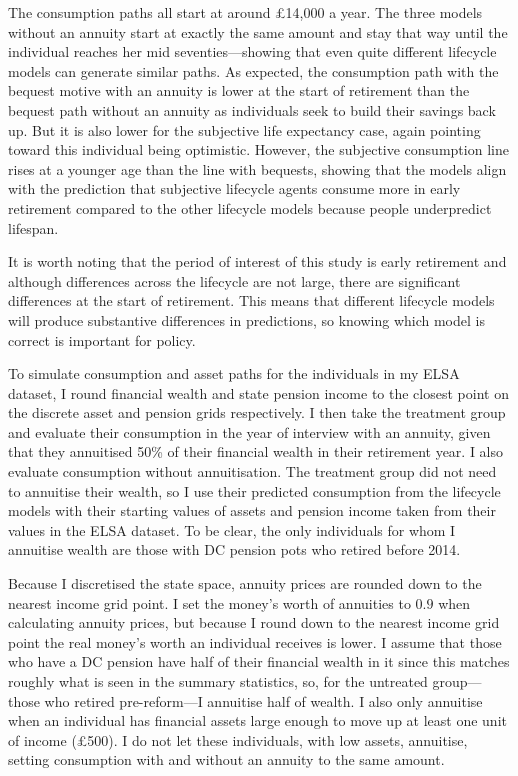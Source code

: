 \documentclass[12pt]{article}
\begin{document}
The consumption paths all start at around £14,000 a year. The three models without an
annuity start at exactly the same amount and stay that way until the individual
reaches her mid seventies---showing that even quite different lifecycle models
can generate similar paths. As expected, the consumption path with the bequest
motive with an annuity is lower at the start of retirement than the bequest path
without an annuity as individuals seek to build their savings back up. But it is
also lower for the subjective life expectancy case, again pointing toward this
individual being optimistic. However, the subjective consumption line rises at a
younger age than the line with bequests, showing that the models align with the
prediction that subjective lifecycle agents consume more in early retirement
compared to the other lifecycle models because people underpredict lifespan.

It is worth noting that the period of interest of this study is early retirement
and although differences across the lifecycle are not large, there are
significant differences at the start of retirement. This means that different
lifecycle models will produce substantive differences in predictions, so knowing
which model is correct is important for policy.

To simulate consumption and asset paths for the individuals in my ELSA dataset,
I round financial wealth and state pension income to the closest point on the
discrete asset and pension grids respectively. I then take the treatment group
and evaluate their consumption in the year of interview with an annuity, given
that they annuitised 50\% of their financial wealth in their retirement year. I
also evaluate consumption without annuitisation. The treatment group did not
need to annuitise their wealth, so I use their predicted consumption from the
lifecycle models with their starting values of assets and pension income taken
from their values in the ELSA dataset. To be clear, the only individuals for
whom I annuitise wealth are those with DC pension pots who retired before 2014.

Because I discretised the state space, annuity prices are rounded down to the
nearest income grid point. I set the money's worth of annuities to $0.9$ when
calculating annuity prices, but because I round down to the nearest income grid
point the real money's worth an individual receives is lower. I assume that
those who have a DC pension have half of their financial wealth in it since this
matches roughly what is seen in the summary statistics, so, for the untreated
group---those who retired pre-reform---I annuitise half of wealth. I also only
annuitise when an individual has financial assets large enough to move up at
least one unit of income (£500). I do not let these individuals, with low
assets, annuitise, setting consumption with and without an annuity to the same
amount.
\end{document}
